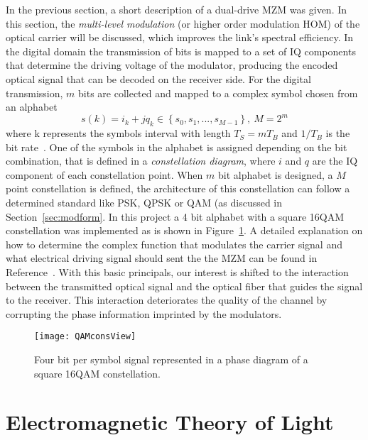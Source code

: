 In the previous section, a short description of a dual-drive MZM was given. In this section,  the \textit{multi-level modulation} (or higher order modulation HOM) of the optical carrier will be discussed, which improves the link's spectral efficiency. In the digital domain the transmission of bits is mapped to a set of IQ components that determine the driving voltage of the modulator, producing the encoded optical signal that can be decoded on the receiver side. For the digital transmission, $m$ bits are collected and mapped to a complex symbol chosen from an alphabet
\begin{equation}
s(k)=i_{k}+jq_{k} \in \left\{s_{0},s_{1},...,s_{M-1}\right\},\ M=2^{m} 
\end{equation}
where k represents the symbols interval with length $T_{S}=mT_{B}$ and $1/T_{B}$ is the bit rate~\cite{seimetz2005multi}. One of the symbols in the alphabet is assigned depending on the bit combination, that is defined in a \textit{constellation diagram}, where $i$ and $q$ are the IQ component of each constellation point. When $m$ bit alphabet is designed, a $M$ point constellation is defined, the architecture of this constellation can follow a determined standard like PSK, QPSK or QAM (as discussed in Section~\ref{sec:modform}. In this project a  4 bit alphabet with a square 16QAM constellation was implemented as is shown in Figure~\ref{fig:16QAMcons}. A detailed explanation on how to determine the complex function that modulates the carrier signal and what electrical driving signal should sent the the MZM can be found in Reference~\cite{seimetz2005multi}. With this basic principals, our interest is shifted to the interaction between the transmitted optical signal and the optical fiber that guides the signal to the receiver. This interaction deteriorates the quality of the channel by corrupting the phase information imprinted by the modulators.   
 
\begin{figure}[h]
\centering
\texttt{[image: QAMconsView]}
\caption{Four bit per symbol signal represented in a phase diagram of a square 16QAM constellation. }
\label{fig:16QAMcons}
\end{figure}




 




\section{Electromagnetic Theory of Light}

